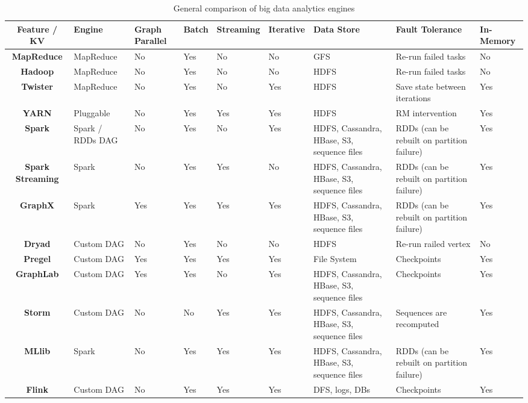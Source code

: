 \documentclass[]{article}
\begin{document}
\begin{table}
	\begin{adjustbox}{center} 
		\begin{tabulary}{1.7\linewidth}{|c|L|L|L|L|L|L|L|L|}
			\hline 
			\textbf{Feature / KV} & \textbf{Engine} & \textbf{Graph Parallel} & \textbf{Batch} & \textbf{Streaming} & \textbf{Iterative} & \textbf{Data Store} &\textbf{Fault Tolerance} & \textbf{In-Memory}  \\
			\hline 
			\textbf{MapReduce} & MapReduce & No & Yes & No & No & GFS & Re-run failed tasks & No\\ 
			\hline 
			\textbf{Hadoop} & MapReduce & No & Yes & No & No & HDFS & Re-run failed tasks & No\\ 
			\hline 
			\textbf{Twister} & MapReduce & No & Yes & No & Yes & HDFS & Save state between iterations & Yes\\ 
			\hline 
			\textbf{YARN} & Pluggable & No & Yes & Yes & Yes & HDFS & RM intervention & Yes\\ 
			\hline 
			\textbf{Spark} & Spark / RDDs DAG & No & Yes & No & Yes & HDFS, Cassandra, HBase, S3, sequence files & RDDs (can be rebuilt on partition failure) & Yes\\ 
			\hline 
			\textbf{Spark Streaming} & Spark & No & Yes & Yes & No & HDFS, Cassandra, HBase, S3, sequence files & RDDs (can be rebuilt on partition failure) & Yes\\ 
			\hline 
			\textbf{GraphX} & Spark  & Yes & Yes & Yes & Yes &HDFS, Cassandra, HBase, S3, sequence files & RDDs (can be rebuilt on partition failure) & Yes \\ 
			\hline 
			\textbf{Dryad} & Custom DAG & No & Yes & No & No & HDFS & Re-run railed vertex & No\\ 
			\hline 
			\textbf{Pregel} & Custom DAG  & Yes & Yes & Yes & Yes & File System & Checkpoints & Yes\\ 
			\hline 
			\textbf{GraphLab} & Custom DAG & Yes & Yes & No & Yes & HDFS, Cassandra, HBase, S3, sequence files & Checkpoints & Yes\\ 
			\hline 
			\textbf{Storm} & Custom DAG & No & No & Yes & Yes & HDFS, Cassandra, HBase, S3, sequence files & Sequences are recomputed & Yes\\ 
			\hline 
			\textbf{MLlib} & Spark & No & Yes & Yes & Yes & HDFS, Cassandra, HBase, S3, sequence files & RDDs (can be rebuilt on partition failure) & Yes\\ 
			\hline 
			\textbf{Flink} & Custom DAG & No & Yes & Yes & Yes & DFS, logs, DBs & Checkpoints & Yes\\ 
			\hline 
		\end{tabulary} 
	\end{adjustbox}
	\caption{General comparison of big data analytics engines}
	\label{table:analytcs-comparison}
\end{table}
\end{document}
